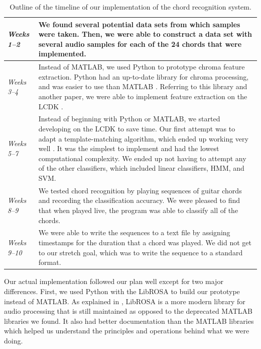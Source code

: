 \documentclass[journal]{IEEEtran}
\begin{document}
\begin{table}[ht]
    \centering
    \caption{Outline of the timeline of our implementation of the chord recognition system.}
    \begin{tabularx}{0.95\linewidth}{|>{\hsize=0.4\hsize}X|>{\hsize=1.6\hsize}X|}
        \hline
            \textit{Weeks 1--2}
            & 
            We found several potential data sets from which samples were taken.
            Then, we were able to construct a data set with several audio samples for each of the 24 chords that were implemented. \\
        \hline
            \textit{Weeks 3--4}
            &
            Instead of MATLAB, we used Python to prototype chroma feature extraction.
            Python had an up-to-date library for chroma processing, and was easier to use than MATLAB \cite{librosa}.
            Referring to this library and another paper, we were able to implement feature extraction on the LCDK \cite{librosa, stark}. \\
        \hline
            \textit{Weeks 5--7}
            &
            Instead of beginning with Python or MATLAB, we started developing on the LCDK to save time.
            Our first attempt was to adapt a template-matching algorithm, which ended up working very well \cite{stark}.
            It was the simplest to implement and had the lowest computational complexity.
            We ended up not having to attempt any of the other classifiers, which included linear classifiers, HMM, and SVM. \\
        \hline
            \textit{Weeks 8--9}
            &
            We tested chord recognition by playing sequences of guitar chords and recording the classification accuracy.
            We were pleased to find that when played live, the program was able to classify all of the chords. \\
        \hline
            \textit{Weeks 9--10}
            &
            We were able to write the sequences to a text file by assigning timestamps for the duration that a chord was played.
            We did not get to our stretch goal, which was to write the sequence to a standard format. \\
        \hline
    \end{tabularx}
    \label{tab:implementation}
\end{table}

Our actual implementation followed our plan well except for two major differences.
First, we used Python with the LibROSA to build our prototype instead of MATLAB.
As explained in , LibROSA is a more modern library for audio processing that is still maintained as opposed to the deprecated MATLAB libraries we found.
It also had better documentation than the MATLAB libraries which helped us understand the principles and operations behind what we were doing.
\end{document}
